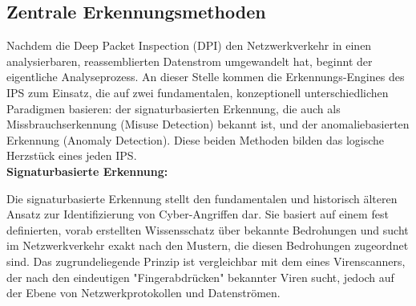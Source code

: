\subsection{Zentrale Erkennungsmethoden}
Nachdem die Deep Packet Inspection (DPI) den Netzwerkverkehr in einen analysierbaren, reassemblierten Datenstrom umgewandelt hat, beginnt der eigentliche Analyseprozess. An dieser Stelle kommen die Erkennungs-Engines des IPS zum Einsatz, die auf zwei fundamentalen, konzeptionell unterschiedlichen Paradigmen basieren: der signaturbasierten Erkennung, die auch als Missbrauchserkennung (Misuse Detection) bekannt ist, und der anomaliebasierten Erkennung (Anomaly Detection). Diese beiden Methoden bilden das logische Herzstück eines jeden IPS.\\

\textbf{Signaturbasierte Erkennung:}

Die signaturbasierte Erkennung stellt den fundamentalen und historisch älteren Ansatz zur Identifizierung von Cyber-Angriffen dar. Sie basiert auf einem fest definierten, vorab erstellten Wissensschatz über bekannte Bedrohungen und sucht im Netzwerkverkehr exakt nach den Mustern, die diesen Bedrohungen zugeordnet sind. Das zugrundeliegende Prinzip ist vergleichbar mit dem eines Virenscanners, der nach den eindeutigen "Fingerabdrücken" bekannter Viren sucht, jedoch auf der Ebene von Netzwerkprotokollen und Datenströmen.\\

